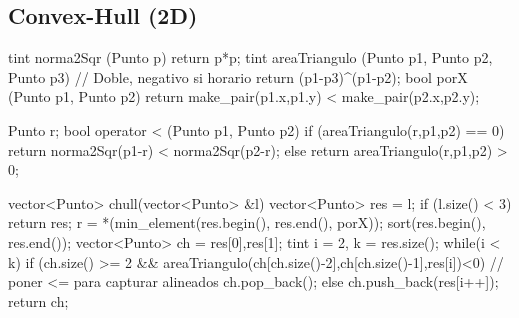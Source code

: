 \subsection{Convex-Hull (2D)}
\begin{code}
	
tint norma2Sqr (Punto p)
{
	return p*p;
}
tint areaTriangulo (Punto p1, Punto p2, Punto p3) // Doble, negativo si horario
{
	return (p1-p3)^(p1-p2);
}
bool porX (Punto p1, Punto p2)
{
	return make_pair(p1.x,p1.y) < make_pair(p2.x,p2.y);
}

Punto r;
bool operator < (Punto p1, Punto p2) 
{
	if (areaTriangulo(r,p1,p2) == 0)
		return norma2Sqr(p1-r) < norma2Sqr(p2-r);
	else
		return areaTriangulo(r,p1,p2) > 0;	
}	
	
vector<Punto> chull(vector<Punto> &l) 
{
	vector<Punto> res = l;
	if (l.size() < 3)
		return res;
	r = *(min_element(res.begin(), res.end(), porX));
	sort(res.begin(), res.end());
	vector<Punto> ch = {res[0],res[1]};  
	tint i = 2, k = res.size();
	while(i < k) 
		if (ch.size() >= 2 && areaTriangulo(ch[ch.size()-2],ch[ch.size()-1],res[i])<0) // poner <= para capturar alineados
			ch.pop_back();
		else 
			ch.push_back(res[i++]);
	return ch;
}
\end{code}

